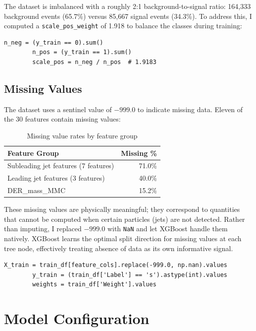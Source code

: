 \documentclass[12pt]{article}
\begin{document}
	The dataset is imbalanced with a roughly 2:1 background-to-signal ratio: 164,333 background events (65.7\%) versus 85,667 signal events (34.3\%). To address this, I computed a \texttt{scale\_pos\_weight} of 1.918 to balance the classes during training:
	
	\begin{lstlisting}[caption={Computing class weight correction}]
		n_neg = (y_train == 0).sum()
		n_pos = (y_train == 1).sum()
		scale_pos = n_neg / n_pos  # 1.9183
	\end{lstlisting}
	
	\subsection*{Missing Values}
	
	The dataset uses a sentinel value of $-999.0$ to indicate missing data. Eleven of the 30 features contain missing values:
	
	\begin{table}[H]
		\centering
		\begin{tabular}{lr}
			\toprule
			\textbf{Feature Group} & \textbf{Missing \%} \\
			\midrule
			Subleading jet features (7 features) & 71.0\% \\
			Leading jet features (3 features) & 40.0\% \\
			DER\_mass\_MMC & 15.2\% \\
			\bottomrule
		\end{tabular}
		\caption{Missing value rates by feature group}
	\end{table}
	\newpage
	These missing values are physically meaningful; they correspond to quantities that cannot be computed when certain particles (jets) are not detected. Rather than imputing, I replaced $-999.0$ with \texttt{NaN} and let XGBoost handle them natively. XGBoost learns the optimal split direction for missing values at each tree node, effectively treating absence of data as its own informative signal.
	
	\begin{lstlisting}[caption={Preprocessing: sentinel replacement and label encoding}]
		X_train = train_df[feature_cols].replace(-999.0, np.nan).values
		y_train = (train_df['Label'] == 's').astype(int).values
		weights = train_df['Weight'].values
	\end{lstlisting}
	
	\newpage
	\section*{Model Configuration}
	
\end{document}
